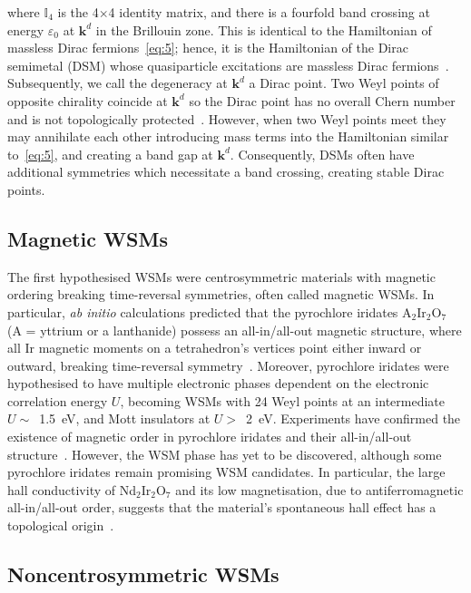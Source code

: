 \documentclass[11pt, a4paper]{article}
\begin{document}
where $\mathbb{I}_4$ is the 4$\times$4 identity matrix, and there is a fourfold
band crossing at energy $\varepsilon_0$ at $\bm{k}^d$ in the
Brillouin zone. This is identical to the Hamiltonian of massless
Dirac fermions~\eqref{eq:5};
hence, it is the Hamiltonian of the Dirac semimetal (DSM)
whose quasiparticle excitations are massless Dirac fermions~\cite{DSM_Na3Bi}.
Subsequently, we call the degeneracy at $\bm{k}^d$ a Dirac point.
Two Weyl points of opposite chirality coincide at $\bm{k}^d$ so the Dirac point 
has no overall Chern number and is not topologically protected~\cite{WSMreview}.
However, when two Weyl points meet they may annihilate each other 
introducing mass terms into the Hamiltonian similar to~\eqref{eq:5}, and
creating a band gap at $\bm{k}^d$. Consequently, DSMs often have additional symmetries
which necessitate a band crossing, creating stable Dirac points.

\subsection{Magnetic WSMs}

The first hypothesised WSMs were centrosymmetric materials with magnetic ordering 
breaking time-reversal symmetries, often called magnetic WSMs. In particular, 
\textit{ab initio} calculations predicted that the pyrochlore iridates A$_{2}$Ir$_{2}$O$_{7}$
(A = yttrium or a lanthanide) possess an all-in/all-out magnetic structure, where all
Ir magnetic moments on a tetrahedron's vertices point either inward or outward, breaking
time-reversal symmetry~\cite{pyrochlore_abin}. Moreover, pyrochlore iridates were hypothesised to 
have multiple electronic phases dependent on the electronic correlation energy $U$, becoming
WSMs with 24 Weyl points at an intermediate $U \sim$~\qty{1.5}{\electronvolt},
and Mott insulators at $U >$~\qty{2}{\electronvolt}.
Experiments have confirmed the existence of magnetic 
order in pyrochlore iridates and their all-in/all-out structure~\cite{pyrochlore_exp}.
However, the WSM phase has yet to be discovered, although some pyrochlore iridates remain promising
WSM candidates. In particular, the large hall conductivity of Nd$_{2}$Ir$_{2}$O$_{7}$ and its low 
magnetisation, due to antiferromagnetic all-in/all-out order,
suggests that the material's spontaneous hall effect has a topological origin~\cite{pyrochlore_Hall}.


\subsection{Noncentrosymmetric WSMs}
\end{document}
